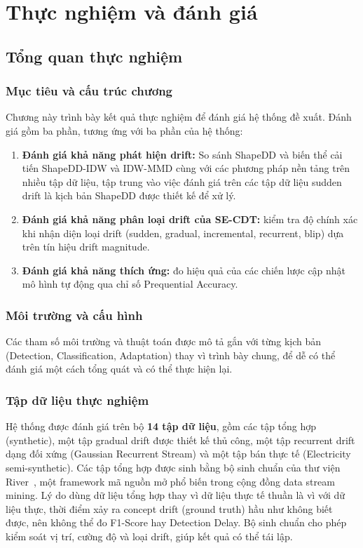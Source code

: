 \chapter{Thực nghiệm và đánh giá}
\label{chap:experiments}

\section{Tổng quan thực nghiệm}
\label{sec:overview}

\subsection{Mục tiêu và cấu trúc chương}
Chương này trình bày kết quả thực nghiệm để đánh giá hệ thống đề xuất. Đánh giá gồm ba phần, tương ứng với ba phần của hệ thống:
\begin{enumerate}
	\item \textbf{Đánh giá khả năng phát hiện drift:} So sánh ShapeDD và biến thể cải tiến ShapeDD-IDW và IDW-MMD cùng với các phương pháp nền tảng trên nhiều tập dữ liệu, tập trung vào việc đánh giá trên các tập dữ liệu sudden drift là kịch bản ShapeDD được thiết kế để xử lý.
	\item \textbf{Đánh giá khả năng phân loại drift của SE-CDT:} kiểm tra độ chính xác khi nhận diện loại drift (sudden, gradual, incremental, recurrent, blip) dựa trên tín hiệu drift magnitude.
	\item \textbf{Đánh giá khả năng thích ứng:} đo hiệu quả của các chiến lược cập nhật mô hình tự động qua chỉ số Prequential Accuracy.
\end{enumerate}

\subsection{Môi trường và cấu hình}
\label{sec:dataset-config}
Các tham số môi trường và thuật toán được mô tả gắn với từng kịch bản (Detection, Classification, Adaptation) thay vì trình bày chung, để dễ có thể đánh giá một cách tổng quát và có thể thực hiện lại.

\subsection{Tập dữ liệu thực nghiệm}

Hệ thống được đánh giá trên bộ \textbf{14 tập dữ liệu}, gồm các tập tổng hợp (synthetic), một tập gradual drift được thiết kế thủ công, một tập recurrent drift dạng đối xứng (Gaussian Recurrent Stream) và một tập bán thực tế (Electricity semi-synthetic). Các tập tổng hợp được sinh bằng bộ sinh chuẩn của thư viện River~\cite{river2021}, một framework mã nguồn mở phổ biến trong cộng đồng data stream mining. Lý do dùng dữ liệu tổng hợp thay vì dữ liệu thực tế thuần là vì với dữ liệu thực, thời điểm xảy ra concept drift (ground truth) hầu như không biết được, nên không thể đo F1-Score hay Detection Delay. Bộ sinh chuẩn cho phép kiểm soát vị trí, cường độ và loại drift, giúp kết quả có thể tái lập.

